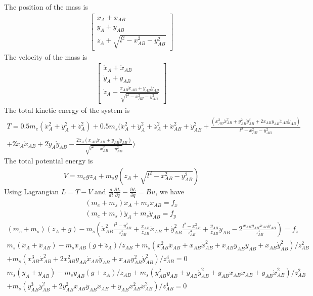 \documentclass{article}
\begin{document}
The position of the mass is
\begin{align}
	\begin{bmatrix}
		x_A + x_{AB}\\
		y_A + y_{AB}\\
		z_A + \sqrt{l^2 - x_{AB}^2 - y_{AB}^2}
	\end{bmatrix}
\end{align}
The velocity of the mass is
\begin{align}
	\begin{bmatrix}
		\dot{x}_A + \dot{x}_{AB}\\
		\dot{y}_A + \dot{y}_{AB}\\
		\dot{z}_A - \frac{x_{AB}\dot{x}_{AB} + y_{AB}\dot{y}_{AB}}{\sqrt{l^2-x_{AB}^2 - y_{AB}^2}}
	\end{bmatrix}
\end{align}
The total kinetic energy of the system is
\begin{multline}
	T = 0.5 m_e (\dot{x}_A^2 + \dot{y}_A^2 +\dot{z}_A^2) + 0.5 m_s(\dot{x}_A^2 + \dot{y}_A^2 + \dot{z}_A^2 + \dot{x}_{AB}^2 + \dot{y}_{AB}^2 + \frac{(x_{AB}^2\dot{x}_{AB}^2 + y_{AB}^2\dot{y}_{AB}^2 + 2x_{AB}y_{AB}\dot{x}_{AB}\dot{y}_{AB})}{l^2-x_{AB}^2-y_{AB}^2}\\
	+ 2\dot{x}_A\dot{x}_{AB} + 2\dot{y}_A\dot{y}_{AB} - \frac{2\dot{z}_A(x_{AB}\dot{x}_{AB}+y_{AB}\dot{y}_{AB})}{\sqrt{l^2-x_{AB}^2-y_{AB}^2}})
\end{multline}
The total potential energy is
\begin{align}
	V = m_egz_A + m_sg(z_A + \sqrt{l^2-x_{AB}^2-y_{AB}^2})
\end{align}
Using Lagrangian $L = T-V$ and $\frac{d}{dt}\frac{\partial L}{\partial \dot{q}}-\frac{\partial L}{\partial q} = Bu$, we have
\begin{align}
	(m_e + m_s)\ddot{x}_A + m_s\ddot{x}_{AB} = f_x\\
	(m_e + m_s)\ddot{y}_A + m_s\ddot{y}_{AB} = f_y
\end{align}
\begin{multline}
	(m_e + m_s)(\ddot{z}_A+g) - m_s\left(\dot{x}_{AB}^2\frac{l^2 - y_{AB}^2}{z_{AB}^3} + \frac{x_{AB}}{z_{AB}}\ddot{x}_{AB} + \dot{y}_{AB}^2\frac{l^2-x_{AB}^2}{z_{AB}^3} + \frac{y_{AB}}{z_{AB}}\ddot{y}_{AB} - 2 \frac{x_{AB}y_{AB}\dot{x}_{AB}\dot{y}_{AB}}{z_{AB}^3}\right) = f_z
\end{multline}
\begin{multline}
	m_s(\ddot{x}_A + \ddot{x}_{AB}) - m_sx_{AB}(g+\ddot{z}_A)/z_{AB} + m_s(x_{AB}^2\ddot{x}_{AB}+x_{AB}\dot{x}_{AB}^2+x_{AB}y_{AB}\ddot{y}_{AB}+x_{AB}\dot{y}_{AB}^2)/z_{AB}^2\\
	+ m_s(x_{AB}^3\dot{x}_{AB}^2 + 2x_{AB}^2y_{AB}\dot{x}_{AB}\dot{y}_{AB} + x_{AB}y_{AB}^2\dot{y}_{AB}^2)/z_{AB}^4=0
\end{multline}
\begin{multline}
	m_s(\ddot{y}_A + \ddot{y}_{AB}) - m_sy_{AB}(g+\ddot{z}_A)/z_{AB} + m_s(y_{AB}^2\ddot{y}_{AB}+y_{AB}\dot{y}_{AB}^2+y_{AB}x_{AB}\ddot{x}_{AB}+y_{AB}\dot{x}_{AB}^2)/z_{AB}^2\\
	+ m_s(y_{AB}^3\dot{y}_{AB}^2 + 2y_{AB}^2x_{AB}\dot{y}_{AB}\dot{x}_{AB} + y_{AB}x_{AB}^2\dot{x}_{AB}^2)/z_{AB}^4=0
\end{multline}
\end{document}
